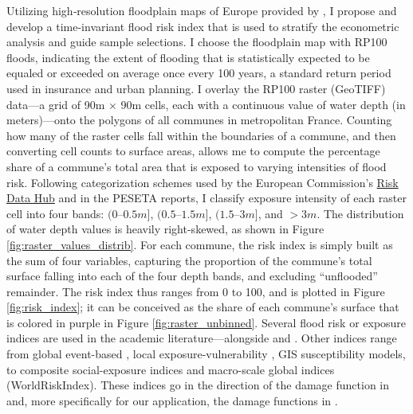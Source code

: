 

\noindent
Utilizing high‐resolution floodplain maps of Europe provided by \citet{dottori_et_al_2022}, I propose and develop a time-invariant flood risk index that is used to stratify the econometric analysis and guide sample selections. I choose the floodplain map with RP100 floods, indicating the extent of flooding that is statistically expected to be equaled or exceeded on average once every 100 years, a standard return period used in insurance and urban planning. I overlay the RP100 raster (GeoTIFF) data—a grid of 90m × 90m cells, each with a continuous value of water depth (in meters)—onto the polygons of all communes in metropolitan France. Counting how many of the raster cells fall within the boundaries of a commune, and then converting cell counts to surface areas, allows me to compute the percentage share of a commune's total area that is exposed to varying intensities of flood risk. Following categorization schemes used by the European Commission’s \href{https://drmkc.jrc.ec.europa.eu/risk-data-hub#/}{Risk
 Data Hub} and in the PESETA reports, I classify exposure intensity of each raster cell into four bands: $(0–0.5m]$, $(0.5–1.5m]$, $(1.5–3m]$, and $>3m$. The distribution of water depth values is heavily right-skewed, as shown in Figure \ref{fig:raster_values_distrib}. For each commune, the risk index is simply built as the sum of four variables, capturing the proportion of the commune’s total surface falling into each of the four depth bands, and excluding “unflooded” remainder. The risk index thus ranges from 0 to 100, and is plotted in Figure \ref{fig:risk_index}; it can be conceived as the share of each commune’s surface that is colored in purple in Figure \ref{fig:raster_unbinned}. Several flood risk or exposure indices are used in the academic literature—alongside \cite{indaco2024adapting} and \cite{hussain2024flooding}. Other indices range from global event-based \citep{okazawa2011development}, local exposure-vulnerability \cite{anindita2020flood}, GIS susceptibility models, to composite social-exposure indices and macro-scale global indices (WorldRiskIndex). These indices go in the direction of the damage function in \cite{carleton2022valuing} and, more specifically for our application, the damage functions in \cite{bilal2023anticipating}.

